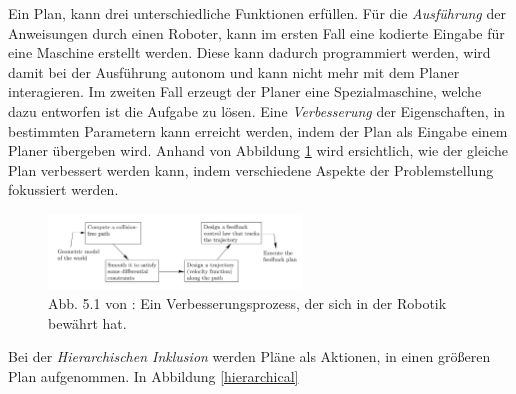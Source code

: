 Ein Plan, kann drei unterschiedliche Funktionen erfüllen.
Für die \textit{Ausführung} der Anweisungen durch einen Roboter, kann im ersten Fall eine kodierte Eingabe für eine Maschine erstellt werden. 
Diese kann dadurch programmiert werden, wird damit bei der Ausführung autonom und kann nicht mehr mit dem Planer interagieren.
Im zweiten Fall erzeugt der Planer eine Spezialmaschine, welche dazu entworfen ist die Aufgabe zu lösen.\cite[~S. 21]{Lav06}
Eine \textit{Verbesserung} der Eigenschaften, in bestimmten Parametern kann erreicht werden, indem der Plan als Eingabe einem Planer übergeben wird. Anhand von Abbildung \ref{lav02} wird ersichtlich, wie der gleiche Plan verbessert werden kann, indem verschiedene Aspekte der Problemstellung fokussiert werden.\cite[~S. 22]{Lav06}

\begin{figure} %
	\centering
	\includegraphics[width=0.6\textwidth]{images/img247.png}
	\caption{Abb. 5.1 von \cite{Cor}:  Ein Verbesserungsprozess, der sich in der Robotik bewährt hat.}
	\label{lav02}
\end{figure}

Bei der \textit{Hierarchischen Inklusion} werden Pläne als Aktionen, in einen größeren Plan aufgenommen. In Abbildung \ref{hierarchical}

